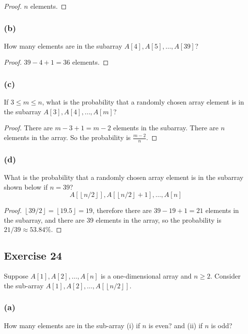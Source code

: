 \documentclass[14pt]{extarticle}
\newcommand{\floor}[1]{{\left\lfloor#1\right\rfloor}}
\begin{document}
\begin{proof}
$n$ elements.
\end{proof}

\subsubsection{(b)}
How many elements are in the subarray \(A[4], A[5], \ldots, A[39]\)?

\begin{proof}
\(39 - 4 + 1 = 36\) elements.
\end{proof}

\subsubsection{(c)}
If \(3 \leq m \leq n\), what is the probability that a randomly chosen array element is in the subarray 
\(A[3], A[4], \ldots, A[m]\)?

\begin{proof}
There are \(m - 3 + 1 = m-2\) elements in the subarray. There are $n$ elements in the array. So the probability is 
\(\frac{m-2}{n}\).
\end{proof}

\subsubsection{(d)}
What is the probability that a randomly chosen array element is in the subarray shown below if \(n = 39\)?
\[A[\floor{n/2}], A[\floor{n/2}+1], \ldots, A[n]\]
\begin{proof}
\(\floor{39/2} = \floor{19.5} = 19\), therefore there are \(39 - 19 + 1 = 21\) elements in the subarray, and there 
are 39 elements in the array, so the probability is \(21/39 \approx 53.84\%\).
\end{proof}

\subsection{Exercise 24}
Suppose \(A[1], A[2], \ldots, A[n]\) is a one-dimensional array and \(n \geq 2\). Consider the sub-array 
\(A[1], A[2], \ldots, A[\floor{n/2}]\).

\subsubsection{(a)}
How many elements are in the sub-array (i) if $n$ is even? and (ii) if $n$ is odd?
\end{document}
